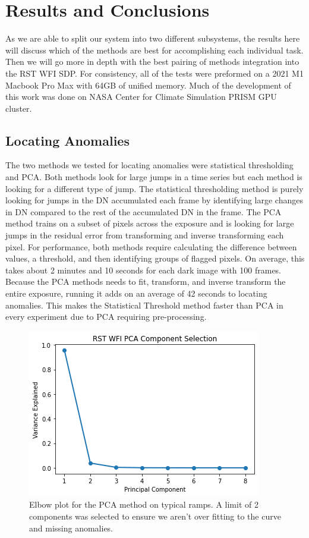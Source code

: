 \section{Results and Conclusions}
\label{rst/sec:results}

As we are able to split our system into two different subsystems, the results here will discuss which of the methods are best for accomplishing each individual task. 
Then we will go more in depth with the best pairing of methods integration into the RST WFI SDP. 
For consistency, all of the tests were preformed on a 2021 M1 Macbook Pro Max with 64GB of unified memory.
Much of the development of this work was done on NASA Center for Climate Simulation PRISM GPU cluster. 

\subsection{Locating Anomalies}
The two methods we tested for locating anomalies were statistical thresholding and PCA.
Both methods look for large jumps in a time series but each method is looking for a different type of jump.
The statistical thresholding method is purely looking for jumps in the DN accumulated each frame by identifying large changes in DN compared to the rest of the accumulated DN in the frame. 
The PCA method trains on a subset of pixels across the exposure and is looking for large jumps in the residual error from transforming and inverse transforming each pixel. 
For performance, both methods require calculating the difference between values, a threshold, and then identifying groups of flagged pixels. 
On average, this takes about 2 minutes and 10 seconds for each dark image with 100 frames. 
Because the PCA methods needs to fit, transform, and inverse transform the entire exposure, running it adds on an average of 42 seconds to locating anomalies. 
This makes the Statistical Threshold method faster than PCA in every experiment due to PCA requiring pre-processing. 

\begin{figure}
    \centering
    \includegraphics[width=.5\linewidth]{figs/rst/elbow.png}
    \caption{Elbow plot for the PCA method on typical ramps. A limit of 2 components was selected to ensure we aren't over fitting to the curve and missing anomalies.}
    \label{rst/fig:elbow}
\end{figure}

